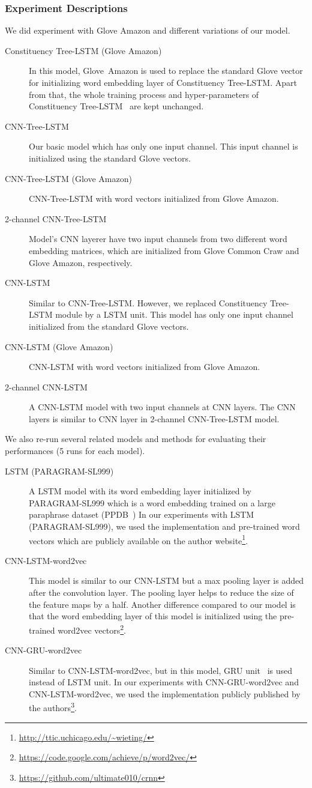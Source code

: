 \subsubsection{Experiment Descriptions}
We did experiment with Glove Amazon and different variations of our model.
\begin{description}
	\item[Constituency Tree-LSTM (Glove Amazon)] In this model, Glove~Amazon is used to replace the standard Glove vector for initializing word embedding layer of Constituency Tree-LSTM.
	Apart from that, the whole training process and hyper-parameters of Constituency Tree-LSTM~\cite{treeLSTM} are kept unchanged.
	\item[CNN-Tree-LSTM] Our basic model which has only one input channel.
	This input channel is initialized using the standard Glove vectors.
	\item[CNN-Tree-LSTM (Glove Amazon)] CNN-Tree-LSTM with word vectors initialized from Glove Amazon.
	\item [2-channel CNN-Tree-LSTM] Model's CNN layerer have two input channels from two different word embedding matrices, which are initialized from Glove Common Craw and Glove Amazon, respectively.
	\item[CNN-LSTM] Similar to CNN-Tree-LSTM. However, we replaced Constituency Tree-LSTM module by a LSTM unit.
	This model has only one input channel initialized from the standard Glove vectors.
	\item [CNN-LSTM (Glove Amazon)] CNN-LSTM with word vectors initialized from Glove Amazon.
	\item [2-channel CNN-LSTM] A CNN-LSTM model with two input channels at CNN layers. The CNN layers is similar to CNN layer in 2-channel CNN-Tree-LSTM model.
\end{description}
We also re-run several related models and methods for evaluating their performances (5 runs for each model).
\begin{description}
	\item[LSTM (PARAGRAM-SL999)~\cite{wieting2015towards}] A LSTM model with its word embedding layer initialized by PARAGRAM-SL999 which is a word embedding trained on a large paraphrase dataset (PPDB~\cite{ganitkevitch2013ppdb})
	In our experiments with LSTM (PARAGRAM-SL999), we used the implementation and pre-trained word vectors which are publicly available on the author website\footnote{\url{http://ttic.uchicago.edu/~wieting/}}.
	\item [CNN-LSTM-word2vec~\cite{cnn-rnn}] This model is similar to our CNN-LSTM but a max pooling layer is added after the convolution layer.
	The pooling layer helps to reduce the size of the feature maps by a half.
	Another difference compared to our model is that the word embedding layer of this model is initialized using the pre-trained word2vec vectors\footnote{\url{https://code.google.com/achieve/p/word2vec/}}.
	\item [CNN-GRU-word2vec~\cite{cnn-rnn}] Similar to CNN-LSTM-word2vec, but in this model, GRU unit~\cite{gru} is used instead of LSTM unit.
	In our experiments with CNN-GRU-word2vec and CNN-LSTM-word2vec, we used the implementation publicly published by the authors\footnote{\url{https://github.com/ultimate010/crnn}}.
\end{description}
